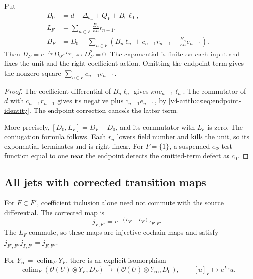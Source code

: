\begin{proposition}
\label{v4-arith:cs:prop:source-correction}
Put
\begin{align*}
 D_0&=d+\Delta_{b_-}+Q_Y+B_0\ell_0,\\
 L_F&=\sum_{n\in F}\frac{B_n}{\kappa n}r_{n-1},\\
 D_F&=D_0+\sum_{n\in F}
       \left(B_n\ell_n+c_{n-1}r_{n-1}
                        -\frac{B_n}{\kappa n}e_{n-1}\right).
\end{align*}
Then \(D_F=e^{-L_F}D_0e^{L_F}\), so \(D_F^2=0\). The exponential is finite
on each input and fixes the unit and the right coefficient action. Omitting
the endpoint term gives the nonzero square \(\sum_{n\in F}c_{n-1}e_{n-1}\).
\end{proposition}

\begin{proof}
The coefficient differential of \(B_n\ell_n\) gives \(\kappa n
c_{n-1}\ell_n\). The commutator of \(d\) with \(c_{n-1}r_{n-1}\) gives its
negative plus \(c_{n-1}e_{n-1}\), by
\eqref{v4-arith:cs:eq:endpoint-identity}. The endpoint correction cancels
the latter term.

More precisely, \([D_0,L_F]=D_F-D_0\), and its commutator with \(L_F\) is
zero. The conjugation formula follows. Each \(r_n\) lowers field number and
kills the unit, so its exponential terminates and is right-linear. For
\(F=\{1\}\), a suspended \(e_\Phi\) test function equal to one near the
endpoint detects the omitted-term defect as \(c_0\).
\end{proof}

\subsection{All jets with corrected transition maps}

For \(F\subset F'\), coefficient inclusion alone need not commute with the
source differential. The corrected map is
\[
 j_{F,F'}=e^{-(L_{F'}-L_F)}\iota_{F,F'}.
\]
The \(L_F\) commute, so these maps are injective cochain maps and satisfy
\(j_{F',F''}j_{F,F'}=j_{F,F''}\).

For \(Y_\infty=\operatorname{colim}_FY_F\), there is an explicit isomorphism
\begin{equation}
 \operatorname{colim}_F(\mathcal O(U)\otimes Y_F,D_F)
       \xrightarrow{\sim}(\mathcal O(U)\otimes Y_\infty,D_0),
 \qquad [u]_F\longmapsto e^{L_F}u.
 \label{v4-arith:cs:eq:corrected-limit}
\end{equation}


